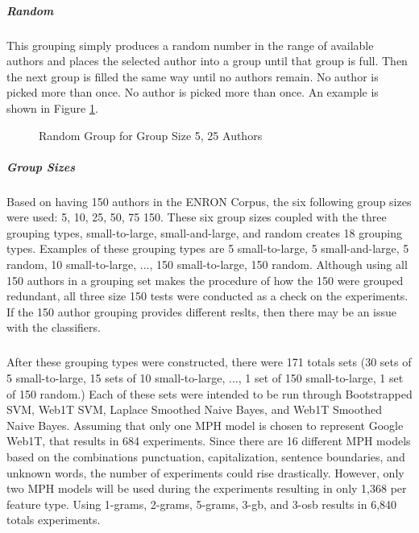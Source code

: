 		\subparagraph{Random} This grouping simply produces a random number in the range of available authors and places the selected author into a group until that group is full.  Then the next group is filled the same way until no authors remain.  No author is picked more than once. No author is picked more than once. An example is shown in Figure \ref{fig:randomGrouping}.
		\begin{figure}[h!]
			\begin{center}
				\caption{Random Group for Group Size 5, 25 Authors}
				\label{fig:randomGrouping}
			\end{center}
		\end{figure}
		\subparagraph{Group Sizes} Based on having 150 authors in the ENRON Corpus, the six following group sizes were used: 5, 10, 25, 50, 75 150.  These six group sizes coupled with the three grouping types, small-to-large, small-and-large, and random creates 18 grouping types.  Examples of these grouping types are 5 small-to-large, 5 small-and-large, 5 random, 10 small-to-large, ..., 150 small-to-large, 150 random.  Although using all 150 authors in a grouping set makes the procedure of how the 150 were grouped redundant, all three size 150 tests were conducted as a check on the experiments. If the 150 author grouping provides different reslts, then there may be an issue with the classifiers.
		\subparagraph{}After these grouping types were constructed, there were 171 totals sets (30 sets of 5 small-to-large, 15 sets of 10 small-to-large, ..., 1 set of 150 small-to-large, 1 set of 150 random.)  Each of these sets were intended to be run through Bootstrapped SVM, Web1T SVM, Laplace Smoothed Naive Bayes, and Web1T Smoothed Naive Bayes.  Assuming that only one MPH model is chosen to represent Google Web1T, that results in 684 experiments.  Since there are 16 different MPH models based on the combinations punctuation, capitalization, sentence boundaries, and unknown words, the number of experiments could rise drastically.  However, only two MPH models will be used during the experiments resulting in only 1,368 per feature type.  Using 1-grams, 2-grams, 5-grams, 3-gb, and 3-osb results in 6,840 totals experiments.
	
